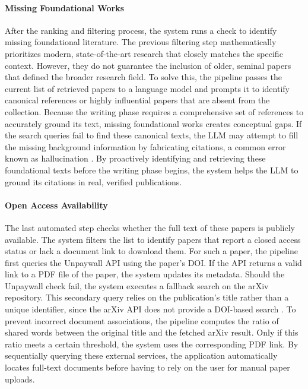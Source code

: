 \paragraph{Missing Foundational Works}
After the ranking and filtering process, the system runs a check to identify missing foundational literature.
The previous filtering step mathematically prioritizes modern, state-of-the-art research that closely matches the specific context. 
However, they do not guarantee the inclusion of older, seminal papers that defined the broader research field.
To solve this, the pipeline passes the current list of retrieved papers to a language model and prompts it to identify canonical references or highly influential papers that are absent from the collection.
Because the writing phase requires a comprehensive set of references to accurately ground its text, missing foundational works creates conceptual gaps.
If the search queries fail to find these canonical texts, the LLM may attempt to fill the missing background information by fabricating citations, a common error known as hallucination \cite{Lewis2020, Shuster2021}. 
By proactively identifying and retrieving these foundational texts before the writing phase begins, the system helps the LLM to ground its citations in real, verified publications.

\paragraph{Open Access Availability}
The last automated step checks whether the full text of these papers is publicly available. 
The system filters the list to identify papers that report a closed access status or lack a document link to download them.
For such a paper, the pipeline first queries the Unpaywall API using the paper's DOI.
If the API returns a valid link to a PDF file of the paper, the system updates its metadata.
Should the Unpaywall check fail, the system executes a fallback search on the arXiv repository.
This secondary query relies on the publication's title rather than a unique identifier, since the arXiv API does not provide a DOI-based search \cite{arXiv}.
To prevent incorrect document associations, the pipeline computes the ratio of shared words between the original title and the fetched arXiv result.
Only if this ratio meets a certain threshold, the system uses the corresponding PDF link.
By sequentially querying these external services, the application automatically locates full-text documents before having to rely on the user for manual paper uploads.

